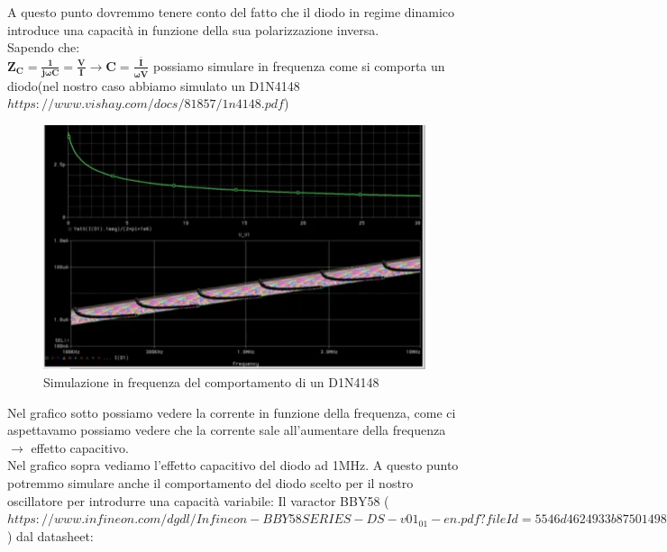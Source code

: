 \documentclass{article}
\begin{document}
A questo punto dovremmo tenere conto del fatto che il diodo in regime dinamico introduce una capacità in funzione della sua polarizzazione inversa.\\
Sapendo che:\\  \LARGE$\bm{Z_C=\frac{1}{j \omega C}=\frac{V}{I} \rightarrow C=\frac{\bar{I}}{\omega \bar{V}}}$ \normalsize possiamo simulare in frequenza come si comporta un diodo(nel nostro caso abbiamo simulato un D1N4148 $https://www.vishay.com/docs/81857/1n4148.pdf$)
~\begin{figure}[H]
\includegraphics[width=\textwidth]{D1N4148.png}
\centering
\caption{Simulazione in frequenza del comportamento di un D1N4148}
\label{fig:foo}
\end{figure}
Nel grafico sotto possiamo vedere la corrente in funzione della frequenza, come ci aspettavamo possiamo vedere che la corrente sale all'aumentare della frequenza $\rightarrow$ effetto capacitivo.\\Nel grafico sopra vediamo l'effetto capacitivo del diodo ad 1MHz.
A questo punto potremmo simulare anche il comportamento del diodo scelto per il nostro oscillatore per introdurre una capacità variabile:  Il varactor BBY58 ($https://www.infineon.com/dgdl/Infineon-BBY58SERIES-DS-v01_01-en.pdf?fileId=5546d4624933b8750149880de2927e14$) dal datasheet: 
\end{document}
